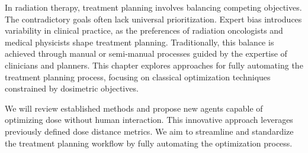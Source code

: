 
In radiation therapy, treatment planning involves balancing competing objectives.
The contradictory goals often lack universal prioritization.
Expert bias introduces variability in clinical practice, as the preferences of radiation oncologists and medical physicists shape treatment planning.
Traditionally, this balance is achieved through manual or semi-manual processes guided by the expertise of clinicians and planners.
This chapter explores approaches for fully automating the treatment planning process, focusing on classical optimization techniques constrained by dosimetric objectives. 

We will review established methods and propose new agents capable of optimizing dose without human interaction.
This innovative approach leverages previously defined dose distance metrics.
We aim to streamline and standardize the treatment planning workflow by fully automating the optimization process. 